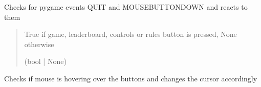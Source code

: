 \documentclass[letterpaper,10pt,english]{sphinxmanual}
\begin{document}
\begin{fulllineitems}
\begin{fulllineitems}
\label{\detokenize{menu:menu.Menu.QUIT_CHOICE}}
\pysigstartsignatures
{}
\pysigstopsignatures
\end{fulllineitems}


\begin{fulllineitems}
\label{\detokenize{menu:menu.Menu.RULES_CHOICE}}
\pysigstartsignatures
{}
\pysigstopsignatures
\end{fulllineitems}


\begin{fulllineitems}
\label{\detokenize{menu:menu.Menu.check_events}}
\pysigstartsignatures
{}
\pysigstopsignatures
\sphinxAtStartPar
Checks for pygame events QUIT and MOUSEBUTTONDOWN and reacts to them
\begin{quote}\begin{description}
\sphinxAtStartPar
True if game, leaderboard, controls or rules button is pressed, None otherwise

\sphinxAtStartPar
(bool | None)

\end{description}\end{quote}

\end{fulllineitems}


\begin{fulllineitems}
\label{\detokenize{menu:menu.Menu.check_hover}}
\pysigstartsignatures
{}
\pysigstopsignatures
\sphinxAtStartPar
Checks if mouse is hovering over the buttons and changes the cursor accordingly


\end{fulllineitems}
\end{fulllineitems}
\end{document}
